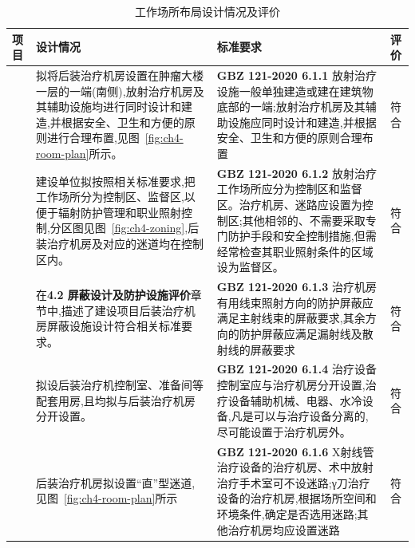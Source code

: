 \begin{table}[H]
\centering
\caption{工作场所布局设计情况及评价}
\label{tab:ch4-layout-eval}
\begin{tabular}{|
>{\centering\arraybackslash}m{2cm}|
>{\centering\arraybackslash}m{6cm}|
>{\centering\arraybackslash}m{6cm}|
>{\centering\arraybackslash}m{1cm}|
}
\hline
项目 & 设计情况 & 标准要求 & 评价 \\
\hline
\multirow{5}{=}{\centering 后装治疗机房}
& \raggedright 拟将后装治疗机房设置在肿瘤大楼一层的一端(南侧),放射治疗机房及其辅助设施均进行同时设计和建造,并根据安全、卫生和方便的原则进行合理布置,见图~\ref{fig:ch4-room-plan}所示。
& \raggedright \textbf{GBZ 121-2020 6.1.1} \newline 放射治疗设施一般单独建造或建在建筑物底部的一端;放射治疗机房及其辅助设施应同时设计和建造,并根据安全、卫生和方便的原则合理布置
& 符合 \\
\cline{2-4}
& \raggedright 建设单位拟按照相关标准要求,把工作场所分为控制区、监督区,以便于辐射防护管理和职业照射控制,分区图见图~\ref{fig:ch4-zoning},后装治疗机房及对应的迷道均在控制区内。
& \raggedright \textbf{GBZ 121-2020 6.1.2} \newline 放射治疗工作场所应分为控制区和监督区。治疗机房、迷路应设置为控制区;其他相邻的、不需要采取专门防护手段和安全控制措施,但需经常检查其职业照射条件的区域设为监督区。
& 符合 \\
\cline{2-4}
& \raggedright 在\textbf{4.2 屏蔽设计及防护设施评价}章节中,描述了建设项目后装治疗机房屏蔽设施设计符合相关标准要求。
& \raggedright \textbf{GBZ 121-2020 6.1.3} \newline 治疗机房有用线束照射方向的防护屏蔽应满足主射线束的屏蔽要求,其余方向的防护屏蔽应满足漏射线及散射线的屏蔽要求
& 符合 \\
\cline{2-4}
& \raggedright 拟设后装治疗机控制室、准备间等配套用房,且均拟与后装治疗机房分开设置。
& \raggedright \textbf{GBZ 121-2020 6.1.4} \newline 治疗设备控制室应与治疗机房分开设置,治疗设备辅助机械、电器、水冷设备,凡是可以与治疗设备分离的,尽可能设置于治疗机房外。
& 符合 \\
\cline{2-4}
& \raggedright 后装治疗机房拟设置“直”型迷道,见图~\ref{fig:ch4-room-plan}所示
& \raggedright \textbf{GBZ 121-2020 6.1.6} \newline X射线管治疗设备的治疗机房、术中放射治疗手术室可不设迷路;γ刀治疗设备的治疗机房,根据场所空间和环境条件,确定是否选用迷路;其他治疗机房均应设置迷路
& 符合 \\
\hline
\end{tabular}
\end{table}


